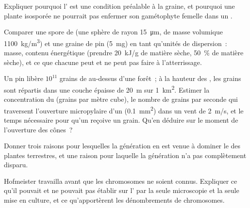 \begin{exercise}[$\star\star$]\label{exo:b2:plant-life-cycles:8}
Expliquer pourquoi l' est une condition préalable à la
graine, et pourquoi une plante isosporée ne pourrait pas enfermer son
gamétophyte femelle dans un .
\end{exercise}

\begin{exercise}[$\star\star$]\label{exo:b2:plant-life-cycles:9}
Comparer une spore de  (une sphère de rayon \qty{15}{\micro m},
de masse volumique \qty{1100}{kg/m^3}) et une graine de pin
(\qty{5}{mg}) en tant qu'unités de dispersion~: masse, contenu
énergétique (prendre \qty{20}{kJ/g} de matière sèche, \qty{50}{\%} de
matière sèche), et ce que chacune peut et ne peut pas faire à
l'atterrissage.
\end{exercise}

\begin{exercise}[$\star\star\star$]\label{exo:b2:plant-life-cycles:10}
Un pin libère $10^{11}$ grains de  au-dessus d'une forêt~; à la
hauteur des , les grains sont répartis dans une couche épaisse de
\qty{20}{m} sur \qty{1}{km^2}. Estimer la concentration du 
(grains par mètre cube), le nombre de grains par seconde qui traversent
l'ouverture micropylaire d'un  (\qty{0.1}{mm^2}) dans un vent de
\qty{2}{m/s}, et le temps nécessaire pour qu'un  reçoive un grain.
Qu'en déduire sur le moment de l'ouverture des cônes~?
\end{exercise}

\begin{exercise}[$\star\star\star$]\label{exo:b2:plant-life-cycles:11}
Donner trois raisons pour lesquelles la génération  en est venue
à dominer le  des plantes terrestres, et une raison pour
laquelle la génération  n'a pas complètement disparu.
\end{exercise}

\begin{exercise}[$\star\star\star$]\label{exo:b2:plant-life-cycles:12}
Hofmeister travailla avant que les chromosomes ne soient connus.
Expliquer ce qu'il pouvait et ne pouvait pas établir sur l' par la seule microscopie et la seule mise en culture, et ce
qu'apportèrent les dénombrements de chromosomes.
\end{exercise}

